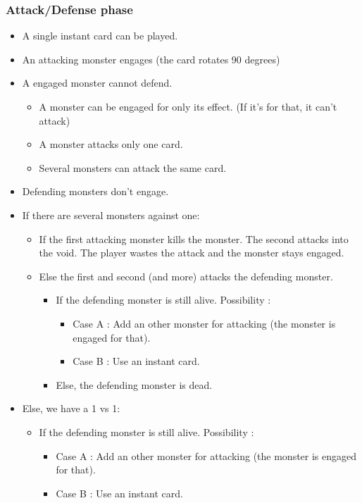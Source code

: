 \documentclass[a4paper,12pt]{book}
\begin{document}
\subsubsection{Attack/Defense phase}
\begin{itemize}
	\item A single instant card can be played.
	\item An attacking monster engages (the card rotates 90 degrees)
	\item A engaged monster cannot defend.
		\begin{itemize}
			\item A monster can be engaged for only its effect. (If it's for that, it can't attack)
			\item A monster attacks only one card.
			\item Several monsters can attack the same card.
		\end{itemize}
	\item Defending monsters don't engage.
	\item If there are several monsters against one:
		\begin{itemize}
			\item If the first attacking monster kills the monster. The second attacks into the void. The player wastes the attack and the monster stays engaged.
			\item Else the first and second (and more) attacks the defending monster.
				\begin{itemize}
					\item If the defending monster is still alive. Possibility :
					\begin{itemize}
						\item Case A : Add an other monster for attacking (the monster is engaged for that).
						\item Case B : Use an instant card.
					\end{itemize}
					\item Else, the defending monster is dead.
				\end{itemize}
		\end{itemize}
\item Else, we have a 1 vs 1:
	\begin{itemize}
	\item If the defending monster is still alive. Possibility :
	\begin{itemize}
		\item Case A : Add an other monster for attacking (the monster is engaged for that).
		\item Case B : Use an instant card.

\end{itemize}
\end{itemize}
\end{itemize}
\end{document}
